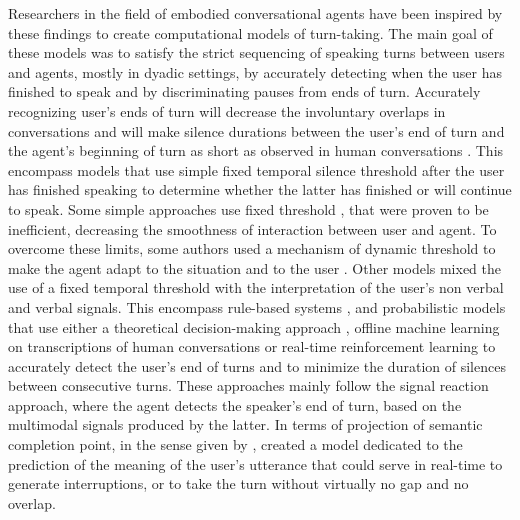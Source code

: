 Researchers in the field of embodied conversational agents have been inspired by these findings to create computational models of turn-taking. 
The main goal of these models was to satisfy the strict sequencing of speaking turns between users and agents, mostly in dyadic settings, by accurately detecting when the user has finished to speak and by discriminating pauses from ends of turn. Accurately recognizing user's ends of turn will decrease the involuntary overlaps in conversations and will make silence durations between the user's end of turn and the agent's beginning of turn as short as observed in human conversations \citep{balentine_debouncing_1997,ward_root_2005,raux_optimizing_2012,jonsdottir_distributed_2013}.
This encompass models that use simple fixed temporal silence threshold after the user has finished speaking to determine whether the latter has finished or will continue to speak. Some simple approaches use fixed threshold \citep{ward_root_2005}, that were proven to be inefficient, decreasing the smoothness of interaction between user and agent. To overcome these limits, some authors used a mechanism of dynamic threshold to make the agent adapt to the situation and to the user \citep{bohus_decisions_2011,witt_modeling_2014}. 
Other models mixed the use of a fixed temporal threshold with the interpretation of the user's non verbal and verbal signals. This encompass rule-based systems \citep{cassell_embodiment_1999,thorisson_natural_2002}, and probabilistic models that use either a theoretical decision-making approach \citep{raux_optimizing_2012}, offline machine learning on transcriptions of human conversations \citep{schlangen_reaction_2006,de_kok_multimodal_2009,huang_multimodal_2011} or real-time reinforcement learning \citep{jonsdottir_distributed_2013} to accurately detect the user's end of turns and to minimize the duration of silences between consecutive turns. These approaches mainly follow the signal reaction approach, where the agent detects the speaker's end of turn, based on the multimodal signals produced by the latter. In terms of projection of semantic completion point, in the sense given by \citep{sacks_simplest_1974}, \cite{de_vault_incremental_2011} created a model dedicated to the prediction of the meaning of the user's utterance that could serve in real-time to generate interruptions, or to take the turn without virtually no gap and no overlap. 

